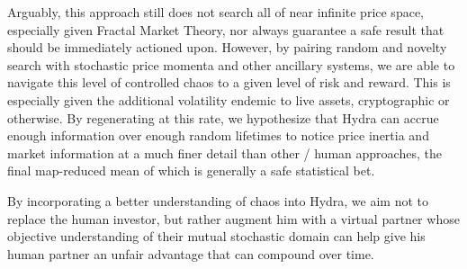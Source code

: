 \documentclass[11pt, a4paper]{awesome-cv}
\begin{document}
\begin{cvletter}
Arguably, this approach still does not search all of near infinite price space, especially
given Fractal Market Theory, nor always guarantee a safe result that should be
immediately actioned upon. However, by pairing random and novelty search with
stochastic price momenta and other ancillary systems, we are able to navigate
this level of controlled chaos to a given level of risk and reward. This is especially
given the additional volatility endemic to live assets, cryptographic or
otherwise. By regenerating at this rate, we hypothesize that Hydra can accrue enough
information over enough random lifetimes to notice price inertia and market
information at a much finer detail than other / human approaches, the final
map-reduced mean of which is generally a safe statistical bet.

By incorporating a better understanding of chaos into Hydra, we aim not to
replace the human investor, but rather augment him with a virtual partner whose
objective understanding of their mutual stochastic domain can help give his
human partner an unfair advantage that can compound over time.

\end{cvletter}


\end{document}
